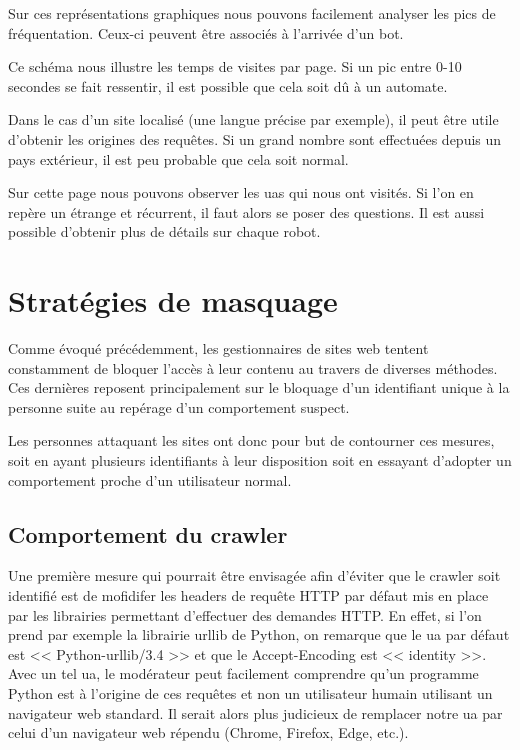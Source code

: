 \documentclass[hideweeklyreports,noposter]{polytech/polytech}
\begin{document}
			
			Sur ces représentations graphiques nous pouvons facilement analyser les pics de fréquentation.
			Ceux-ci peuvent être associés à l'arrivée d'un bot.
			
			
			Ce schéma nous illustre les temps de visites par page.
			Si un pic entre 0-10 secondes se fait ressentir, il est possible que cela soit dû à un automate.
			
			
			Dans le cas d'un site localisé (une langue précise par exemple), il peut être utile d'obtenir les origines des requêtes.
			Si un grand nombre sont effectuées depuis un pays extérieur, il est peu probable que cela soit normal.
			
			
			Sur cette page nous pouvons observer les \glspl{ua} qui nous ont visités.
			Si l'on en repère un étrange et récurrent, il faut alors se poser des questions.
			Il est aussi possible d'obtenir plus de détails sur chaque robot.

	\chapter{Stratégies de masquage}
		Comme évoqué précédemment, les gestionnaires de sites web tentent constamment de bloquer l'accès à leur contenu au travers de diverses méthodes.
		Ces dernières reposent principalement sur le bloquage d'un identifiant unique à la personne suite au repérage d'un comportement suspect.
		
		Les personnes attaquant les sites ont donc pour but de contourner ces mesures, soit en ayant plusieurs identifiants à leur disposition soit en essayant d'adopter un comportement proche d'un utilisateur normal.
		
		\section{Comportement du crawler}
            Une première mesure qui pourrait être envisagée afin d'éviter que le crawler soit identifié est de mofidifer les headers de requête HTTP par défaut mis en place par les librairies permettant d'effectuer des demandes HTTP.
            En effet, si l'on prend par exemple la librairie urllib de Python, on remarque que le \gls{ua} par défaut est << Python-urllib/3.4 >> et que le Accept-Encoding est << identity >>.
            Avec un tel \gls{ua}, le modérateur peut facilement comprendre qu'un programme Python est à l'origine de ces requêtes et non un utilisateur humain utilisant un navigateur web standard.
            Il serait alors plus judicieux de remplacer notre \gls{ua} par celui d'un navigateur web répendu (Chrome, Firefox, Edge, etc.).
            
\end{document}
